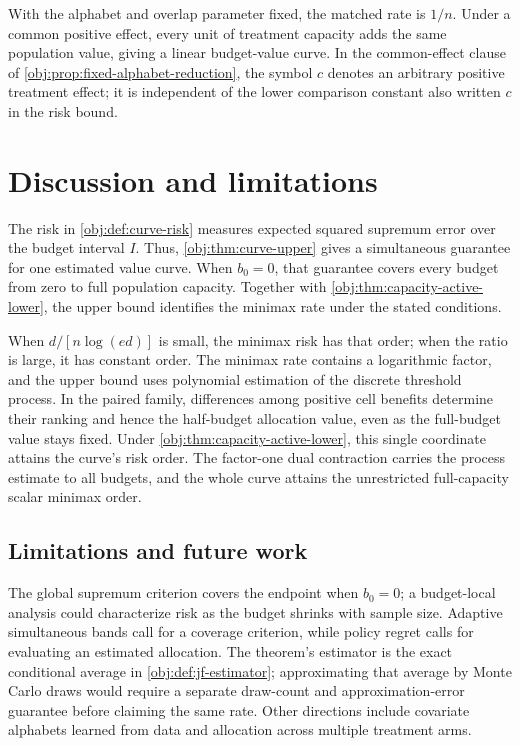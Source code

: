 \documentclass[11pt]{article}
\begin{document}
With the alphabet and overlap parameter fixed, the matched rate is \(1/n\). Under a common positive effect, every unit of treatment capacity adds the same population value, giving a linear budget-value curve.
In the common-effect clause of \cref{obj:prop:fixed-alphabet-reduction}, the symbol \(c\) denotes an arbitrary positive treatment effect; it is independent of the lower comparison constant also written \(c\) in the risk bound.


\section{Discussion and limitations}

The risk in \cref{obj:def:curve-risk} measures expected squared supremum error over the budget interval \(I\). Thus, \cref{obj:thm:curve-upper} gives a simultaneous guarantee for one estimated value curve. When \(b_0=0\), that guarantee covers every budget from zero to full population capacity. Together with \cref{obj:thm:capacity-active-lower}, the upper bound identifies the minimax rate under the stated conditions.

When \(d/[n\log(ed)]\) is small, the minimax risk has that order; when the ratio is large, it has constant order. The minimax rate contains a logarithmic factor, and the upper bound uses polynomial estimation of the discrete threshold process. In the paired family, differences among positive cell benefits determine their ranking and hence the half-budget allocation value, even as the full-budget value stays fixed. Under \cref{obj:thm:capacity-active-lower}, this single coordinate attains the curve’s risk order. The factor-one dual contraction carries the process estimate to all budgets, and the whole curve attains the unrestricted full-capacity scalar minimax order.

\subsection{Limitations and future work}

The global supremum criterion covers the endpoint when \(b_0=0\); a budget-local analysis could characterize risk as the budget shrinks with sample size. Adaptive simultaneous bands call for a coverage criterion, while policy regret calls for evaluating an estimated allocation. The theorem's estimator is the exact conditional average in \cref{obj:def:jf-estimator}; approximating that average by Monte Carlo draws would require a separate draw-count and approximation-error guarantee before claiming the same rate. Other directions include covariate alphabets learned from data and allocation across multiple treatment arms.
\end{document}
